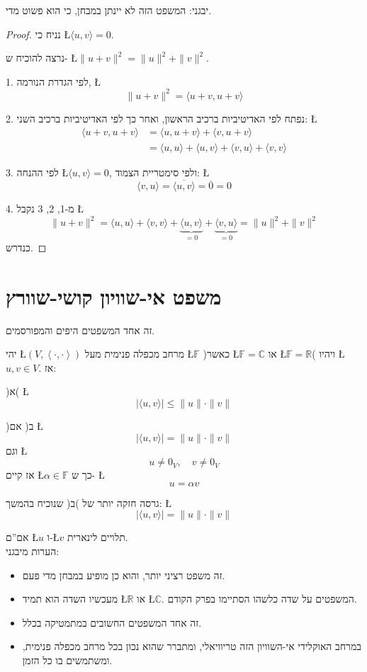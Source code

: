 \documentclass[english,hebrew]{article}
\begin{document}
יבגני: המשפט הזה לא יינתן במבחן, כי הוא פשוט מדי.
\begin{proof}
נניח כי \L{$\langle u,v\rangle=0$}.

נרצה להוכיח ש- \L{$\|u+v\|^{2}=\|u\|^{2}+\|v\|^{2}$}.

1. לפי הגדרת הנורמה, \L{%
\[
\|u+v\|^{2}=\langle u+v,u+v\rangle
\]
}%

2. נפתח לפי האדיטיביות ברכיב הראשון, ואחר כך לפי האדיטיביות ברכיב
השני: \L{%
\begin{align*}
\langle u+v,u+v\rangle & =\langle u,u+v\rangle+\langle v,u+v\rangle\\
 & =\langle u,u\rangle+\langle u,v\rangle+\langle v,u\rangle+\langle v,v\rangle
\end{align*}
}%

3. לפי ההנחה \L{$\langle u,v\rangle=0$}, ולפי סימטריית הצמוד: \L{%
\[
\langle v,u\rangle=\overline{\langle u,v\rangle}=\overline{0}=0
\]
}%

4. מ-1, 2, 3 נקבל \L{%
\[
\|u+v\|^{2}=\langle u,u\rangle+\langle v,v\rangle+\underset{=0}{\underbrace{\langle u,v\rangle}}+\underset{=0}{\underbrace{\langle v,u\rangle}}=\|u\|^{2}+\|v\|^{2}
\]
}%
כנדרש. 
\end{proof}

\section{משפט אי-שוויון קושי-שוורץ}

זה אחד המשפטים היפים והמפורסמים.

יהי \L{$(V,\left\langle \cdot,\cdot\right\rangle )$} מרחב מכפלה פנימית
מעל \L{$\mathbb{F}$} )כאשר \L{$\mathbb{F}=\mathbb{C}$} או \L{$\mathbb{F}=\mathbb{R}$}(
ויהיו \L{$u,v\in V$}. אז:

)א( \L{%
\[
\left|\langle u,v\rangle\right|\leq\|u\|\cdot\|v\|
\]
}%

)ב( אם \L{%
\[
\left|\langle u,v\rangle\right|=\|u\|\cdot\|v\|
\]
}%
וגם \L{%
\[
u\neq0_{V},\quad v\neq0_{V}
\]
}%
אז קיים \L{$\alpha\in\mathbb{F}$} כך ש- \L{%
\[
u=\alpha v
\]
}%

גרסה חזקה יותר של )ב( שנוכיח בהמשך: \L{%
\[
\left|\langle u,v\rangle\right|=\|u\|\cdot\|v\|
\]
}%

אם\textquotedblright ם \L{$u$} ו-\L{$v$} תלויים לינארית. \\

הערות מיבגני:
\begin{itemize}
\item זה משפט רציני יותר, והוא כן מופיע במבחן מדי פעם.
\item מעכשיו השדה הוא תמיד \L{$\mathbb{R}$} או \L{$\mathbb{C}$}. המשפטים
על שדה כלשהו הסתיימו בפרק הקודם.
\item זה אחד המשפטים החשובים במתמטיקה בכלל.
\item במרחב האוקלידי אי-השוויון הזה טריוויאלי, ומתברר שהוא נכון בכל מרחב
מכפלה פנימית, ומשתמשים בו כל הזמן.
\end{itemize}
\end{document}
